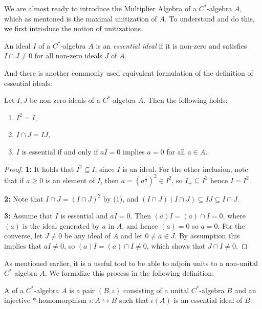 We are almost ready to introduce the Multiplier Algebra of a $C^*$-algebra $A$, which as mentoned is the maximal unitization of $A$. To understand and do this, we first introduce the notion of unitizations.
\begin{definition}
	An ideal $I$ of a $C^*$-algebra $A$ is an  \emph{essential ideal} if it is non-zero and satisfies $I\cap J \neq 0$ for all non-zero ideals $J$ of $A$.
\end{definition}
And there is another commonly used equivalent formulation of the definition of essential ideals:
\begin{lemma}
	Let $I,J$ be non-zero ideals of a $C^*$-algebra $A$. Then the following holds:
	\begin{enumerate}
		\item $I^2 = I$,
		\item $I\cap J = IJ$,
		\item $I$ is essential if and only if $aI=0$ implies $a = 0$ for all $ a \in A$.
	\end{enumerate}	
	\label{mult:essentialequiv}
\end{lemma}
\begin{proof}
	\textbf{1:} It holds that $I^2 \subseteq I$, since $I$ is an ideal. For the other inclusion, note that if $a \geq 0 $ is an element of $I$, then $a=(a^{\frac12})^2 \in I^2$, so $I_+ \subseteq I^2$ hence $I=I^2$.

\noindent\textbf{2:} Note that $I \cap J = (I \cap J )^2$ by (1), and $(I\cap J) (I\cap J) \subseteq IJ \subseteq I \cap J$.

\noindent\textbf{3:} Assume that $I$ is essential and $aI = 0$. Then $(a)I=(a)\cap I = 0$, where $(a)$ is the ideal generated by $a$ in $A$, and hence $(a)=0$ so $a = 0$. For the converse, let $J \neq 0$ be any ideal of $A$ and let $0 \neq a \in J$. By assumption this implies that $aI \neq 0$, so $(a)I=(a)\cap I \neq 0$, which shows that $J \cap I \neq 0$.
\end{proof}
As mentioned earlier, it is a useful tool to be able to adjoin units to a non-unital $C^*$-algebra $A$. We formalize this process in the following definition:
\begin{definition}
	A  of a $C^*$-algebra $A$ is a pair $(B,\iota)$ consisting of a unital $C^*$-algebra $B$ and an injective $*$-homomorphism $\iota \colon A \hookrightarrow B$ such that $\iota(A)$ is an essential ideal of $B$.	
\end{definition}
